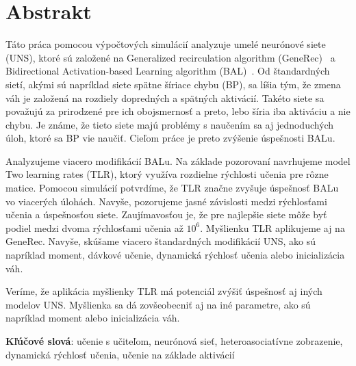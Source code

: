 
\section*{Abstrakt}
Táto práca pomocou výpočtových simulácií analyzuje umelé neurónové siete (UNS), ktoré sú založené na Generalized recirculation algorithm (GeneRec)~\citep{o1996bio} a Bidirectional Activation-based Learning algorithm (BAL)~\citep{farkas2013bal}. Od štandardných sietí, akými sú napríklad siete spätne šíriace chybu (BP), sa líšia tým, že zmena váh je založená na rozdiely dopredných a spätných aktivácií. Takéto siete sa považujú za prirodzené pre ich obojsmernosť a preto, lebo šíria iba aktiváciu a nie chybu. Je známe, že tieto siete majú problémy s naučením sa aj jednoduchých úloh, ktoré sa BP vie naučiť. Cieľom práce je preto zvýšenie úspešnosti BALu. 

Analyzujeme viacero modifikácií BALu. Na základe pozorovaní navrhujeme model Two learning rates (TLR), ktorý využíva rozdielne rýchlosti učenia pre rôzne matice. Pomocou simulácií potvrdíme, že TLR značne zvyšuje úspešnosť BALu vo viacerých úlohách. Navyše, pozorujeme jasné závislosti medzi rýchlosťami učenia a úspešnosťou siete. Zaujímavosťou je, že pre najlepšie siete môže byť podiel medzi dvoma rýchlosťami učenia až $10^6$. Myšlienku TLR aplikujeme aj na GeneRec. Navyše, skúšame viacero štandardných modifikácií UNS, ako sú napríklad moment, dávkové učenie, dynamická rýchlosť učenia alebo inicializácia váh. 

Veríme, že aplikácia myšlienky TLR má potenciál zvýšiť úspešnosť aj iných modelov UNS. Myšlienka sa dá zovšeobecniť aj na iné parametre, ako sú napríklad moment alebo inicializácia váh. 

\begin{flushleft}
  {\bf Kľúčové slová}: učenie s učiteľom, neurónová sieť, heteroasociatívne zobrazenie, dynamická rýchlosť učenia, učenie na základe aktivácií
\end{flushleft}

